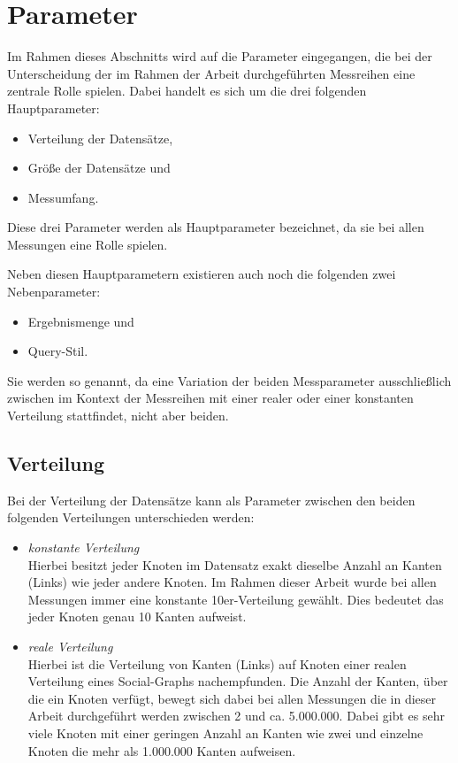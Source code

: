 \section{Parameter}
\label{analyse:parameter}
Im Rahmen dieses Abschnitts wird auf die Parameter eingegangen, die bei der Unterscheidung der im Rahmen der Arbeit durchgeführten Messreihen eine zentrale Rolle spielen. 
Dabei handelt es sich um die drei folgenden Hauptparameter:
\begin{itemize}
    \item Verteilung der Datensätze, 
    \item Größe der Datensätze und 
    \item Messumfang.
\end{itemize}
Diese drei Parameter werden als Hauptparameter bezeichnet, da sie bei allen Messungen eine Rolle spielen.

Neben diesen Hauptparametern existieren auch noch die folgenden zwei Nebenparameter:
\begin{itemize}
    \item Ergebnismenge und 
    \item Query-Stil. 
\end{itemize}
Sie werden so genannt, da eine Variation der beiden Messparameter ausschließlich zwischen im Kontext der Messreihen mit einer realer oder einer konstanten Verteilung stattfindet, nicht aber beiden. 

\subsection{Verteilung}
Bei der Verteilung der Datensätze kann als Parameter zwischen den beiden folgenden Verteilungen unterschieden werden: 
\begin{itemize}
    \item \textit{konstante Verteilung}\\
    Hierbei besitzt jeder Knoten im Datensatz exakt dieselbe Anzahl an Kanten (Links) wie jeder andere Knoten. Im Rahmen dieser Arbeit wurde bei allen Messungen immer eine konstante 10er-Verteilung gewählt. Dies bedeutet das jeder Knoten genau 10 Kanten aufweist.  
    \item \textit{reale Verteilung}\\
    Hierbei ist die Verteilung von Kanten (Links) auf Knoten einer realen Verteilung eines Social-Graphs nachempfunden. Die Anzahl der Kanten, über die ein Knoten verfügt, bewegt sich dabei bei allen Messungen die in dieser Arbeit durchgeführt werden zwischen 2 und ca. 5.000.000. Dabei gibt es sehr viele Knoten mit einer geringen Anzahl an Kanten wie zwei und einzelne Knoten die mehr als 1.000.000 Kanten aufweisen. 
\end{itemize}

